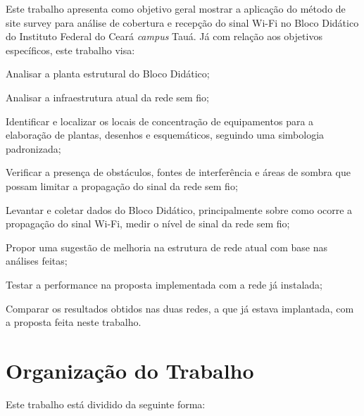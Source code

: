 Este trabalho apresenta como objetivo geral mostrar a aplicação do método de site survey para análise de cobertura e recepção do sinal Wi-Fi no Bloco Didático do Instituto Federal do Ceará \textit{campus} Tauá.
Já com relação aos objetivos específicos, este trabalho visa:
\begin{compactitem}
	\item Analisar a planta estrutural do Bloco Didático;
	\item Analisar a infraestrutura atual da rede sem fio; 
	\item Identificar e localizar os locais de concentração de equipamentos para a elaboração de plantas, desenhos e esquemáticos, seguindo uma simbologia padronizada;
	\item Verificar a presença de obstáculos, fontes de interferência e áreas de sombra que possam limitar a propagação do sinal da rede sem fio;
	\item Levantar e coletar dados do Bloco Didático, principalmente sobre como ocorre a propagação do sinal Wi-Fi, medir o nível de sinal da rede sem fio;
	\item Propor uma sugestão de melhoria na estrutura de rede atual com base nas análises feitas;
	\item Testar a performance na proposta implementada com a rede já instalada;
	\item Comparar os resultados obtidos nas duas redes, a que já estava implantada, com a proposta feita neste trabalho.
\end{compactitem}

\section{Organização do Trabalho}
\label{sec:organnizacao-do-trabalho}

Este trabalho está dividido da seguinte forma:

